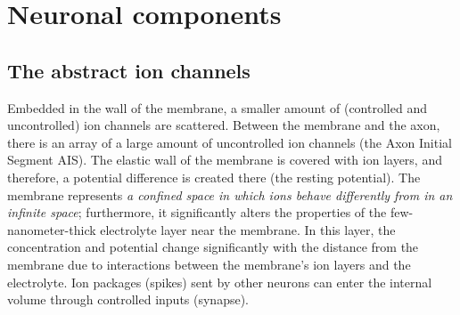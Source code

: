

\chapter[Neuronal components]{Neuronal components\label{sec:Modell-Components}}

\iflatexml
\else
\minitoc
\fi



\section[The abstract ion channels]{The abstract ion channels \label{sec:AbstractIon channels}}

Embedded in the wall of the membrane, a smaller amount of (controlled 
and uncontrolled) ion channels are scattered.
Between the membrane and the axon, there is an array of a large amount of uncontrolled ion channels (the Axon Initial Segment \gls{AIS}). 
The elastic wall of the membrane is covered with ion layers, and therefore, a potential difference is created there (the resting potential).
The membrane represents \textit{a confined space in which ions behave differently from in an infinite space}; furthermore, it significantly alters the properties of the few-nanometer-thick electrolyte layer near the membrane. In this layer, the concentration and potential change significantly with the distance from the membrane due to interactions between the membrane's ion layers and the electrolyte.
Ion packages (spikes) sent by other neurons can enter the internal volume through controlled inputs (synapse).

